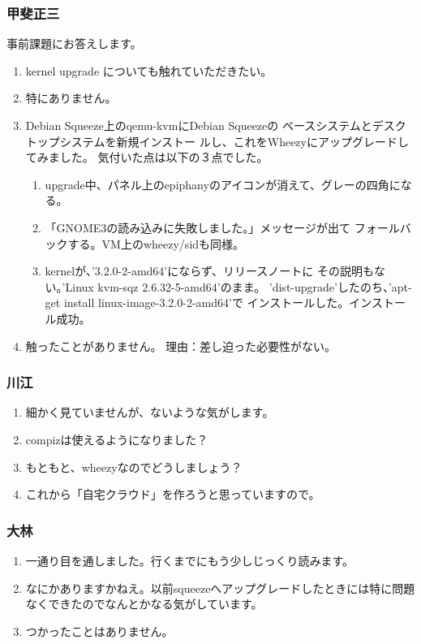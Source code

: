 \documentclass[cjk,dvipdfmx,10pt,compress,%
hyperref={bookmarks=true,bookmarksnumbered=true,bookmarksopen=false,%
colorlinks=false,%
pdftitle={第 71 回 関西 Debian 勉強会},%
pdfauthor={倉敷・のがた・佐々木・かわだ・八津尾},%
pdfsubject={資料},%
}]{beamer}
\begin{document}
\begin{frame}
\frametitle{ 甲斐正三 }
  事前課題にお答えします。
  \begin{enumerate}
  \item %
    kernel upgrade についても触れていただきたい。
  \item %
    特にありません。
  \item %
    Debian Squeeze上のqemu-kvmにDebian Squeezeの
    ベースシステムとデスクトップシステムを新規インストー
    ルし、これをWheezyにアップグレードしてみました。
    気付いた点は以下の３点でした。
    \def\theenumii{\arabic{enumii}}
    \def\labelenumii{(\theenumii)~}
    \begin{enumerate}
    \item %
      upgrade中、パネル上のepiphanyのアイコンが消えて、グレーの四角になる。
    \item %
      「GNOME3の読み込みに失敗しました。」メッセージが出て
      フォールバックする。VM上のwheezy/sidも同様。
    \item %
      kernelが、'3.2.0-2-amd64'にならず、リリースノートに
      その説明もない。'Linux kvm-sqz 2.6.32-5-amd64'のまま。
      'dist-upgrade'したのち、'apt-get install linux-image-3.2.0-2-amd64'で
      インストールした。インストール成功。
    \end{enumerate}
  \item %
    触ったことがありません。
    理由：差し迫った必要性がない。
  \end{enumerate}
\end{frame}

\begin{frame}
  \frametitle{ 川江 }
  \begin{enumerate}
  \item %
   細かく見ていませんが、ないような気がします。
 \item %
   compizは使えるようになりました？
 \item %
   もともと、wheezyなのでどうしましょう？
 \item %
   これから「自宅クラウド」を作ろうと思っていますので。
 \end{enumerate}
\end{frame}

\begin{frame}
  \frametitle{ 大林 }
  \begin{enumerate}
  \item %
   一通り目を通しました。行くまでにもう少しじっくり読みます。
   \setcounter{enumi}{2}
 \item %
   なにかありますかねえ。以前squeezeへアップグレードしたときには特に問題なくできたのでなんとかなる気がしています。
 \item %
   つかったことはありません。
 \end{enumerate}
\end{frame}
\end{document}
